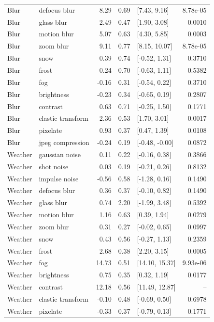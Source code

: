 \begin{longtable}{llrrlr}
Blur & defocus blur & 8.29 & 0.69 & [7.43, 9.16] & 8.78e-05\\
Blur & glass blur & 2.49 & 0.47 & [1.90, 3.08] & 0.0010\\
Blur & motion blur & 5.07 & 0.63 & [4.30, 5.85] & 0.0003\\
Blur & zoom blur & 9.11 & 0.77 & [8.15, 10.07] & 8.78e-05\\
Blur & snow & 0.39 & 0.74 & [-0.52, 1.31] & 0.3710\\
Blur & frost & 0.24 & 0.70 & [-0.63, 1.11] & 0.5382\\
Blur & fog & -0.16 & 0.31 & [-0.54, 0.22] & 0.3710\\
Blur & brightness & -0.23 & 0.34 & [-0.65, 0.19] & 0.2807\\
Blur & contrast & 0.63 & 0.71 & [-0.25, 1.50] & 0.1771\\
Blur & elastic transform & 2.36 & 0.53 & [1.70, 3.01] & 0.0017\\
Blur & pixelate & 0.93 & 0.37 & [0.47, 1.39] & 0.0108\\
Blur & jpeg compression & -0.24 & 0.19 & [-0.48, -0.00] & 0.0872\\
Weather & gaussian noise & 0.11 & 0.22 & [-0.16, 0.38] & 0.3866\\
Weather & shot noise & 0.03 & 0.19 & [-0.21, 0.26] & 0.8132\\
Weather & impulse noise & -0.56 & 0.58 & [-1.28, 0.16] & 0.1490\\
Weather & defocus blur & 0.36 & 0.37 & [-0.10, 0.82] & 0.1490\\
Weather & glass blur & 0.74 & 2.20 & [-1.99, 3.48] & 0.5392\\
Weather & motion blur & 1.16 & 0.63 & [0.39, 1.94] & 0.0279\\
Weather & zoom blur & 0.31 & 0.27 & [-0.02, 0.65] & 0.0997\\
Weather & snow & 0.43 & 0.56 & [-0.27, 1.13] & 0.2359\\
Weather & frost & 2.68 & 0.38 & [2.20, 3.15] & 0.0005\\
Weather & fog & 14.73 & 0.51 & [14.10, 15.37] & 9.93e-06\\
Weather & brightness & 0.75 & 0.35 & [0.32, 1.19] & 0.0177\\
Weather & contrast & 12.18 & 0.56 & [11.49, 12.87] & --\\
Weather & elastic transform & -0.10 & 0.48 & [-0.69, 0.50] & 0.6978\\
Weather & pixelate & -0.33 & 0.37 & [-0.79, 0.13] & 0.1771\\

\end{longtable}
